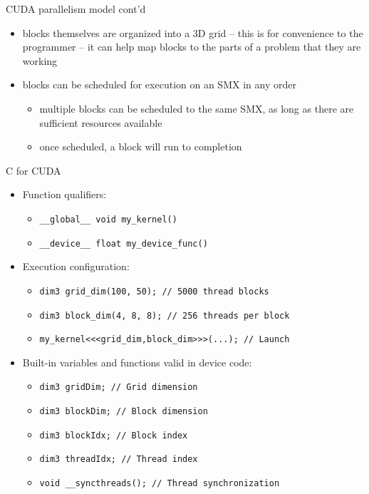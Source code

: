 \documentclass[10pt,t]{beamer}
\begin{document}
  \begin{frame}{CUDA parallelism model cont'd}
    \begin{itemize}
      \item blocks themselves are organized into a 3D grid -- this is for
        convenience to the programmer -- it can help map blocks to the parts of
        a problem that they are working
      \item blocks can be scheduled for execution on an SMX in any order
        \begin{itemize}
          \item multiple blocks can be scheduled to the same SMX, as long as
            there are sufficient resources available
          \item once scheduled, a block will run to completion
        \end{itemize}
    \end{itemize}
  \end{frame}

  \begin{frame}{C for CUDA}
    \begin{itemize}
      \item Function qualifiers:
        \begin{itemize}
          \item \texttt{\_\_global\_\_ void my\_kernel() { }}
          \item \texttt{\_\_device\_\_ float my\_device\_func() { }}
        \end{itemize}

      \item Execution configuration:
        \begin{itemize}
          \item \texttt{dim3 grid\_dim(100, 50); // 5000 thread blocks}
          \item \texttt{dim3 block\_dim(4, 8, 8); // 256 threads per block}
          \item \texttt{my\_kernel<<<grid\_dim,block\_dim>>>(...); // Launch}
        \end{itemize}
      \item Built-in variables and functions valid in device code:
        \begin{itemize}
          \item \texttt{dim3 gridDim; // Grid dimension}
          \item \texttt{dim3 blockDim; // Block dimension}
          \item \texttt{dim3 blockIdx; // Block index}
          \item \texttt{dim3 threadIdx; // Thread index}
          \item \texttt{void \_\_syncthreads(); // Thread synchronization}
        \end{itemize}
    \end{itemize}
  \end{frame}
\end{document}
